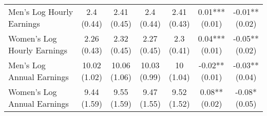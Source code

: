 \begin{landscape}
\begin{ThreePartTable}
\begin{longtable}[t]{>{\raggedright\arraybackslash}p{5cm}cccccc}
\hspace{1em}Men’s Log Hourly Earnings & \specialcell{2.4\\(0.44)} & \specialcell{2.41\\(0.45)} & \specialcell{2.4\\(0.44)} & \specialcell{2.41\\(0.43)} & \specialcell{0.01***\\(0.01)} & \specialcell{-0.01**\\(0.02)}\\
\hspace{1em}Women’s Log Hourly Earnings & \specialcell{2.26\\(0.43)} & \specialcell{2.32\\(0.45)} & \specialcell{2.27\\(0.45)} & \specialcell{2.3\\(0.41)} & \specialcell{0.04***\\(0.01)} & \specialcell{-0.05**\\(0.02)}\\
\hspace{1em}Men’s Log Annual Earnings & \specialcell{10.02\\(1.02)} & \specialcell{10.06\\(1.06)} & \specialcell{10.03\\(0.99)} & \specialcell{10\\(1.04)} & \specialcell{-0.02**\\(0.01)} & \specialcell{-0.03**\\(0.04)}\\
\hspace{1em}Women’s Log Annual Earnings & \specialcell{9.44\\(1.59)} & \specialcell{9.55\\(1.59)} & \specialcell{9.47\\(1.55)} & \specialcell{9.52\\(1.52)} & \specialcell{0.08**\\(0.02)} & \specialcell{-0.08*\\(0.05)}\\*
\end{longtable}
\end{ThreePartTable}
\end{landscape}
